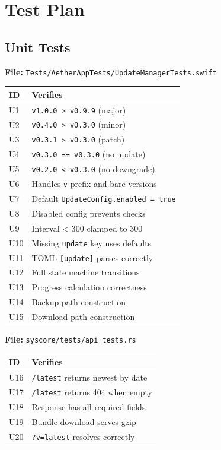 \documentclass[11pt, a4paper]{article}
\begin{document}
\section{Test Plan}
\label{sec:tests}

\subsection{Unit Tests}

\textbf{File:} \texttt{Tests/AetherAppTests/UpdateManagerTests.swift}

\begin{tabularx}{\columnwidth}{lX}
\toprule
\textbf{ID} & \textbf{Verifies} \\
\midrule
U1 & \texttt{v1.0.0 > v0.9.9} (major) \\
U2 & \texttt{v0.4.0 > v0.3.0} (minor) \\
U3 & \texttt{v0.3.1 > v0.3.0} (patch) \\
U4 & \texttt{v0.3.0 == v0.3.0} (no update) \\
U5 & \texttt{v0.2.0 < v0.3.0} (no downgrade) \\
U6 & Handles \texttt{v} prefix and bare versions \\
U7 & Default \texttt{UpdateConfig.enabled = true} \\
U8 & Disabled config prevents checks \\
U9 & Interval < 300 clamped to 300 \\
U10 & Missing \texttt{update} key uses defaults \\
U11 & TOML \texttt{[update]} parses correctly \\
U12 & Full state machine transitions \\
U13 & Progress calculation correctness \\
U14 & Backup path construction \\
U15 & Download path construction \\
\bottomrule
\end{tabularx}

\vspace{6pt}
\textbf{File:} \texttt{syscore/tests/api\_tests.rs}

\begin{tabularx}{\columnwidth}{lX}
\toprule
\textbf{ID} & \textbf{Verifies} \\
\midrule
U16 & \texttt{/latest} returns newest by date \\
U17 & \texttt{/latest} returns 404 when empty \\
U18 & Response has all required fields \\
U19 & Bundle download serves gzip \\
U20 & \texttt{?v=latest} resolves correctly \\
\bottomrule
\end{tabularx}
\end{document}
